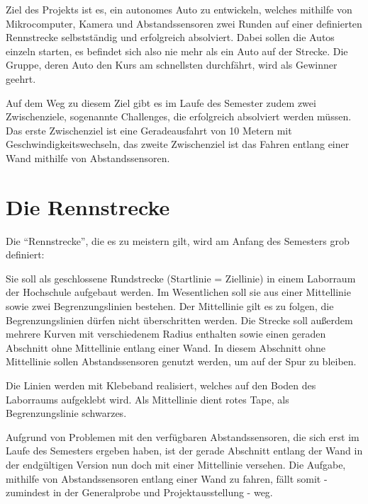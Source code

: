 \documentclass[a4paper, 12pt]{scrartcl}
\begin{document}
Ziel des Projekts ist es, ein autonomes Auto zu entwickeln, welches mithilfe von Mikrocomputer, Kamera und Abstandssensoren zwei Runden auf einer definierten Rennstrecke selbstständig und erfolgreich absolviert. Dabei sollen die Autos einzeln starten, es befindet sich also nie mehr als ein Auto auf der Strecke. Die Gruppe, deren Auto den Kurs am schnellsten durchfährt, wird als Gewinner geehrt.

Auf dem Weg zu diesem Ziel gibt es im Laufe des Semester zudem zwei Zwischenziele, sogenannte Challenges, die erfolgreich absolviert werden müssen. Das erste Zwischenziel ist eine Geradeausfahrt von 10 Metern mit Geschwindigkeitswechseln, das zweite Zwischenziel ist das Fahren entlang einer Wand mithilfe von Abstandssensoren.

\section{Die Rennstrecke}
Die “Rennstrecke”, die es zu meistern gilt, wird am Anfang des Semesters grob definiert:

Sie soll als geschlossene Rundstrecke (Startlinie = Ziellinie) in einem Laborraum der Hochschule aufgebaut werden. Im Wesentlichen soll sie aus einer Mittellinie sowie zwei Begrenzungslinien bestehen. Der Mittellinie gilt es zu folgen, die Begrenzungslinien dürfen nicht überschritten werden. Die Strecke soll außerdem mehrere Kurven mit verschiedenem Radius enthalten sowie einen geraden Abschnitt ohne Mittellinie entlang einer Wand. In diesem Abschnitt ohne Mittellinie sollen Abstandssensoren genutzt werden, um auf der Spur zu bleiben.



Die Linien werden mit Klebeband realisiert, welches auf den Boden des Laborraums aufgeklebt wird. Als Mittellinie dient rotes Tape, als Begrenzungslinie schwarzes. 

Aufgrund von Problemen mit den verfügbaren Abstandssensoren, die sich erst im Laufe des Semesters ergeben haben, ist der gerade Abschnitt entlang der Wand in der endgültigen Version nun doch mit einer Mittellinie versehen. Die Aufgabe, mithilfe von Abstandssensoren entlang einer Wand zu fahren, fällt somit - zumindest in der Generalprobe und Projektausstellung - weg.
\end{document}
